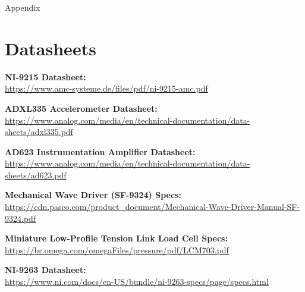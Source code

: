 \documentclass{article}
\begin{document}
\newpage
\thispagestyle{empty}  %
\begin{center}
	\vspace*{\fill}
	{\Huge Appendix}
	\vspace*{\fill}
\end{center}

\newpage
\begin{appendices}
\pagestyle{fancy}
\renewcommand{\thefigure}{A\arabic{figure}}
\setcounter{figure}{0}



\pagebreak

\hypertarget{datasheets}{}
\section{Datasheets}
\begin{enumerate}[label = {[\arabic*]}]
\item \textbf{NI-9215 Datasheet:}\\[2pt] \url{https://www.amc-systeme.de/files/pdf/ni-9215-amc.pdf}

\item \textbf{ADXL335 Accelerometer Datasheet:}\\[2pt] \url{https://www.analog.com/media/en/technical-documentation/data-sheets/adxl335.pdf}

\item \textbf{AD623 Instrumentation Amplifier Datasheet:}\\[2pt]
\url{https://www.analog.com/media/en/technical-documentation/data-sheets/ad623.pdf}

\item \textbf{Mechanical Wave Driver (SF-9324) Specs:}\\[2pt]
\url{https://cdn.pasco.com/product_document/Mechanical-Wave-Driver-Manual-SF-9324.pdf}

\item \textbf{Miniature Low-Profile Tension Link Load Cell Specs:}\\[2pt]
\url{https://br.omega.com/omegaFiles/pressure/pdf/LCM703.pdf}

\item \textbf{NI-9263 Datasheet:}\\[2pt] \url{https://www.ni.com/docs/en-US/bundle/ni-9263-specs/page/specs.html}

\end{enumerate}

\end{appendices}
\end{document}
